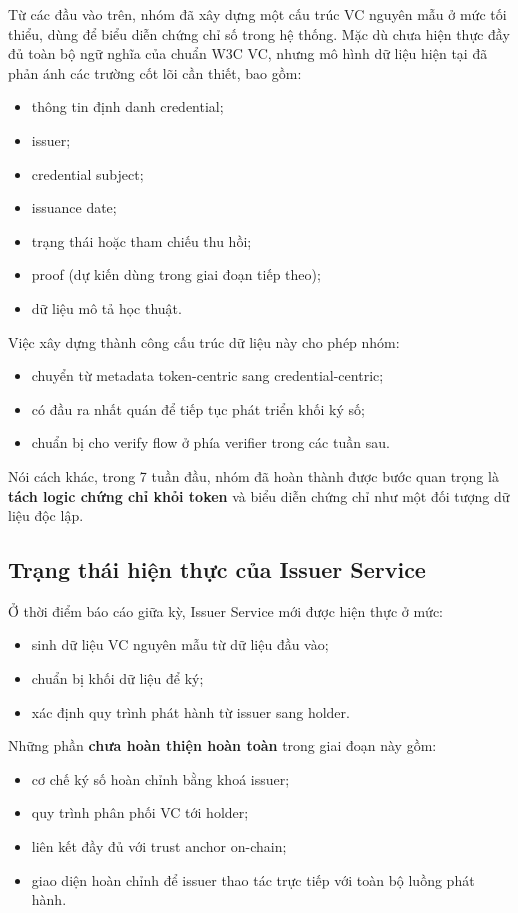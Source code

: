 Từ các đầu vào trên, nhóm đã xây dựng một cấu trúc VC nguyên mẫu ở mức tối thiểu, dùng để biểu diễn chứng chỉ số trong hệ thống. Mặc dù chưa hiện thực đầy đủ toàn bộ ngữ nghĩa của chuẩn W3C VC, nhưng mô hình dữ liệu hiện tại đã phản ánh các trường cốt lõi cần thiết, bao gồm:
\begin{itemize}
    \item thông tin định danh credential;
    \item issuer;
    \item credential subject;
    \item issuance date;
    \item trạng thái hoặc tham chiếu thu hồi;
    \item proof (dự kiến dùng trong giai đoạn tiếp theo);
    \item dữ liệu mô tả học thuật.
\end{itemize}

Việc xây dựng thành công cấu trúc dữ liệu này cho phép nhóm:
\begin{itemize}
    \item chuyển từ metadata token-centric sang credential-centric;
    \item có đầu ra nhất quán để tiếp tục phát triển khối ký số;
    \item chuẩn bị cho verify flow ở phía verifier trong các tuần sau.
\end{itemize}

Nói cách khác, trong 7 tuần đầu, nhóm đã hoàn thành được bước quan trọng là \textbf{tách logic chứng chỉ khỏi token} và biểu diễn chứng chỉ như một đối tượng dữ liệu độc lập.

\subsection{Trạng thái hiện thực của Issuer Service}

Ở thời điểm báo cáo giữa kỳ, Issuer Service mới được hiện thực ở mức:
\begin{itemize}
    \item sinh dữ liệu VC nguyên mẫu từ dữ liệu đầu vào;
    \item chuẩn bị khối dữ liệu để ký;
    \item xác định quy trình phát hành từ issuer sang holder.
\end{itemize}

Những phần \textbf{chưa hoàn thiện hoàn toàn} trong giai đoạn này gồm:
\begin{itemize}
    \item cơ chế ký số hoàn chỉnh bằng khoá issuer;
    \item quy trình phân phối VC tới holder;
    \item liên kết đầy đủ với trust anchor on-chain;
    \item giao diện hoàn chỉnh để issuer thao tác trực tiếp với toàn bộ luồng phát hành.
\end{itemize}

